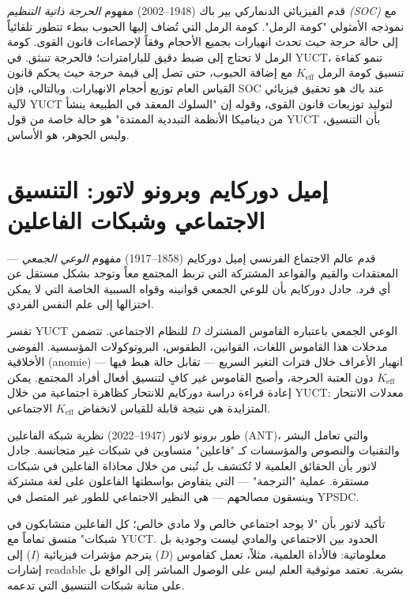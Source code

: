 \documentclass[12pt,a4paper]{article}
\begin{document}
	قدم الفيزيائي الدنماركي بير باك (1948–2002) مفهوم \emph{الحرجة ذاتية التنظيم (SOC)} مع نموذجه الأمثولي "كومة الرمل". كومة الرمل التي تُضاف إليها الحبوب ببطء تتطور تلقائياً إلى حالة حرجة حيث تحدث انهيارات بجميع الأحجام وفقاً لإحصاءات قانون القوى. كومة الرمل لا تحتاج إلى ضبط دقيق للبارامترات؛ فالحرجة تنبثق. في YUCT، تنمو كفاءة تنسيق كومة الرمل \(K_{\mathrm{eff}}\) مع إضافة الحبوب، حتى تصل إلى قيمة حرجة حيث يحكم قانون القياس العام توزيع أحجام الانهيارات. وبالتالي، فإن SOC عند باك هو تحقيق فيزيائي لآلية YUCT لتوليد توزيعات قانون القوى، وقوله إن "السلوك المعقد في الطبيعة ينشأ من ديناميكا الأنظمة التبددية الممتدة" هو حالة خاصة من قول YUCT بأن التنسيق، وليس الجوهر، هو الأساس.
	
	\section{إميل دوركايم وبرونو لاتور: التنسيق الاجتماعي وشبكات الفاعلين}
	
	قدم عالم الاجتماع الفرنسي إميل دوركايم (1858–1917) مفهوم \emph{الوعي الجمعي} — المعتقدات والقيم والقواعد المشتركة التي تربط المجتمع معاً وتوجد بشكل مستقل عن أي فرد. جادل دوركايم بأن للوعي الجمعي قوانينه وقواه السببية الخاصة التي لا يمكن اختزالها إلى علم النفس الفردي.
	
	تفسر YUCT الوعي الجمعي باعتباره القاموس المشترك \(D\) للنظام الاجتماعي. تتضمن مدخلات هذا القاموس اللغات، القوانين، الطقوس، البروتوكولات المؤسسية. الفوضى الأخلاقية (anomie) — انهيار الأعراف خلال فترات التغير السريع — تقابل حالة هبط فيها \(K_{\mathrm{eff}}\) دون العتبة الحرجة، وأصبح القاموس غير كافٍ لتنسيق أفعال أفراد المجتمع. يمكن إعادة قراءة دراسة دوركايم للانتحار كظاهرة اجتماعية من خلال YUCT: معدلات الانتحار المتزايدة هي نتيجة قابلة للقياس لانخفاض \(K_{\mathrm{eff}}\) الاجتماعي.
	
	طور برونو لاتور (1947–2022) نظرية شبكة الفاعلين (ANT)، والتي تعامل البشر والتقنيات والنصوص والمؤسسات كـ "فاعلين" متساوين في شبكات غير متجانسة. جادل لاتور بأن الحقائق العلمية لا تُكتشف بل تُبنى من خلال محاذاة الفاعلين في شبكات مستقرة. عملية "الترجمة" — التي يتفاوض بواسطتها الفاعلون على لغة مشتركة وينسقون مصالحهم — هي النظير الاجتماعي للطور غير المتصل في YPSDC.
	
	تأكيد لاتور بأن "لا يوجد اجتماعي خالص ولا مادي خالص؛ كل الفاعلين متشابكون في شبكات" متسق تماماً مع YUCT. الحدود بين الاجتماعي والمادي ليست وجودية بل معلوماتية: فالأداة العلمية، مثلاً، تعمل كقاموس (\(D\)) يترجم مؤشرات فيزيائية (\(I\)) إلى إشارات readable بشرية. تعتمد موثوقية العلم ليس على الوصول المباشر إلى الواقع بل على متانة شبكات التنسيق التي تدعمه.
	
\end{document}
